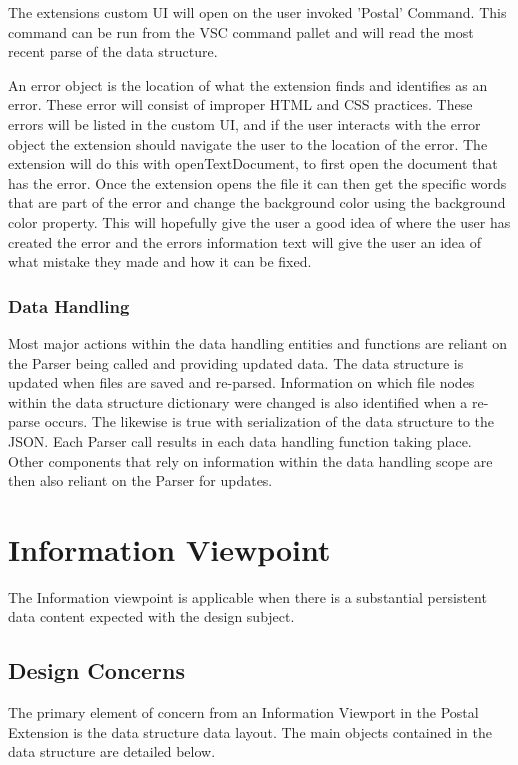 \documentclass[letterpaper,10pt,titlepage,draftclsnofoot,onecolumn,onesided] {IEEEtran}
\begin{document}
The extensions custom UI will open on the user invoked 'Postal' Command. 
This command can be run from the VSC command pallet and will read the most recent parse of the data structure. 

An error object is the location of what the extension finds and identifies as an error.
These error will consist of improper HTML and CSS practices. 
These errors will be listed in the custom UI, and if the user interacts with the error object the extension should navigate the user to the location of the error.
The extension will do this with openTextDocument, to first open the document that has the error. 
Once the extension opens the file it can then get the specific words that are part of the error and change the background color using the background color property. \cite{VSCodeDocumentation}
This will hopefully give the user a good idea of where the user has created the error and the errors information text will give the user an idea of what mistake they made and how it can be fixed.

\subsubsection{Data Handling}
Most major actions within the data handling entities and functions are reliant on the Parser being called and providing updated data.
The data structure is updated when files are saved and re-parsed. 
Information on which file nodes within the data structure dictionary were changed is also identified when a re-parse occurs.
The likewise is true with serialization of the data structure to the JSON.
Each Parser call results in each data handling function taking place. 
Other components that rely on information within the data handling scope are then also reliant on the Parser for updates.
		
\section{Information Viewpoint}
The Information viewpoint is applicable when there is a substantial persistent data content expected with
the design subject. 

\subsection{Design Concerns}
The primary element of concern from an Information Viewport in the Postal Extension is the data structure data layout. 
The main objects contained in the data structure are detailed below.
\end{document}
